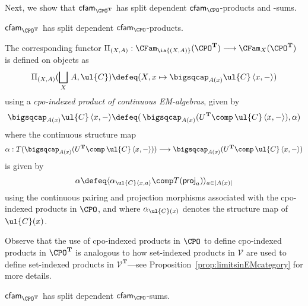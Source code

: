 Next, we show that $\mathsf{cfam}_{\CPO^{\mathbf{T}}}$ has split dependent $\mathsf{cfam}_{\CPO}$-products and -sums. 

\begin{proposition}
$\mathsf{cfam}_{\CPO^{\mathbf{T}}}$ has split dependent $\mathsf{cfam}_{\CPO}$-products.
\end{proposition}

The corresponding functor $\Pi_{(X,A)} : \CFam_{\ia {(X,A)}}(\CPO^{\mathbf{T}}) \longrightarrow \CFam_X(\CPO^{\mathbf{T}})$ is defined on objects as 
\[
\Pi_{(X,A)}(\bigsqcup_{X}\, A , \ul{C}) \defeq (X , x \mapsto \bigsqcap_{A(x)} \ul{C}\, \langle x , - \rangle)
\]
using a \emph{cpo-indexed product of continuous EM-algebras}, given by 
\[
\bigsqcap_{A(x)} \ul{C}\, \langle x , - \rangle \defeq (\,\bigsqcap_{A(x)} (U^{\mathbf{T}} \comp\, \ul{C}\, \langle x , - \rangle) , \alpha)
\]
where the continuous structure map 
\[
\alpha : T(\bigsqcap_{A(x)} (U^{\mathbf{T}} \comp\, \ul{C}\, \langle x , - \rangle)) \longrightarrow \bigsqcap_{A(x)} (U^{\mathbf{T}} \comp\, \ul{C}\, \langle x , - \rangle)
\]
is given by
\[
\alpha \defeq \langle \alpha_{\ul{C} \langle x , a \rangle} \comp T(\mathsf{proj}_a) \rangle_{a \in \vert A(x) \vert}
\]
using the continuous pairing and projection morphisms associated with the cpo-indexed products in $\CPO$, and where $\alpha_{\ul{C}(x)}$ denotes the structure map of $\ul{C}(x)$. 

Observe that the use of cpo-indexed products in $\CPO$ to define cpo-indexed products in $\CPO^{\mathbf{T}}$ is analogous to how set-indexed products in $\mathcal{V}$ are used to define set-indexed products in $\mathcal{V}^{\mathbf{T}}$---see Proposition~\ref{prop:limitsinEMcategory} for more details.

\begin{proposition}
\label{prop:cfamEMalgebrassplitdependentsums}
$\mathsf{cfam}_{\CPO^{\mathbf{T}}}$ has split dependent $\mathsf{cfam}_{\CPO}$-sums.
\end{proposition}

